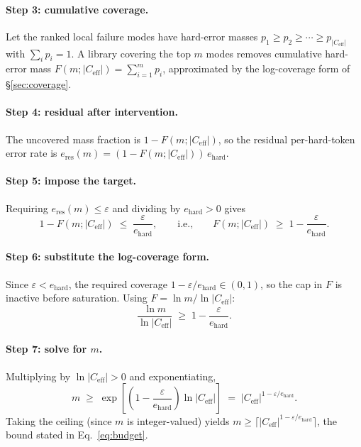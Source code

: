 \documentclass{article}
\theoremstyle{taeplain}
\theoremstyle{taedefn}
\begin{document}
\paragraph{Step 3: cumulative coverage.}
Let the ranked local failure modes have hard-error masses $p_1 \geq p_2 \geq \cdots \geq p_{|C_{\text{eff}}|}$ with $\sum_i p_i = 1$. A library covering the top $m$ modes removes cumulative hard-error mass $F(m; |C_{\text{eff}}|) = \sum_{i=1}^{m} p_i$, approximated by the log-coverage form of \S\ref{sec:coverage}.

\paragraph{Step 4: residual after intervention.}
The uncovered mass fraction is $1 - F(m; |C_{\text{eff}}|)$, so the residual per-hard-token error rate is $e_{\text{res}}(m) = (1 - F(m; |C_{\text{eff}}|))\, e_{\text{hard}}$.

\paragraph{Step 5: impose the target.}
Requiring $e_{\text{res}}(m) \leq \varepsilon$ and dividing by $e_{\text{hard}} > 0$ gives
\[
1 - F(m; |C_{\text{eff}}|) \;\leq\; \frac{\varepsilon}{e_{\text{hard}}},
\qquad\text{i.e.,}\qquad
F(m; |C_{\text{eff}}|) \;\geq\; 1 - \frac{\varepsilon}{e_{\text{hard}}}.
\]

\paragraph{Step 6: substitute the log-coverage form.}
Since $\varepsilon < e_{\text{hard}}$, the required coverage $1 - \varepsilon/e_{\text{hard}} \in (0, 1)$, so the cap in $F$ is inactive before saturation. Using $F = \ln m / \ln |C_{\text{eff}}|$:
\[
\frac{\ln m}{\ln |C_{\text{eff}}|} \;\geq\; 1 - \frac{\varepsilon}{e_{\text{hard}}}.
\]

\paragraph{Step 7: solve for $m$.}
Multiplying by $\ln |C_{\text{eff}}| > 0$ and exponentiating,
\[
m \;\geq\; \exp\!\left[\left(1 - \frac{\varepsilon}{e_{\text{hard}}}\right) \ln |C_{\text{eff}}|\right] \;=\; |C_{\text{eff}}|^{1 - \varepsilon / e_{\text{hard}}}.
\]
Taking the ceiling (since $m$ is integer-valued) yields $m \geq \lceil |C_{\text{eff}}|^{1 - \varepsilon / e_{\text{hard}}} \rceil$, the bound stated in Eq.~\eqref{eq:budget}.
\end{document}
